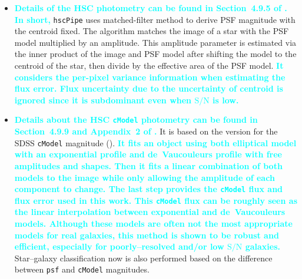 \documentclass[useamsfonts]{pasj01}
\def\hscpipe{\texttt{hscPipe}}
\def\cmodel{\texttt{cModel}}
\def\s2n{{$\mathrm{S}/\mathrm{N}$}}
\newcommand{\song}[1]{\textcolor{cyan} {\textbf{#1}}}
\begin{document}
\begin{enumerate}
\begin{itemize}
                \item \song{
                    Details of the HSC \psf{} photometry can be found in 
                    Section~4.9.5 of \citet{Bosch2017}. 
                    In short, 
                    }
                    \hscpipe{} uses matched-filter method to derive PSF magnitude 
                    with the centroid fixed. 
                    The algorithm matches the image of a star with the PSF model 
                    multiplied by an amplitude. 
                    This amplitude parameter is estimated via the inner product of 
                    the image and PSF model after shifting the model to the centroid 
                    of the star, then divide by the effective area of the PSF model.
                    \song{
                    It considers the per-pixel variance information when estimating 
                    the flux error. 
                    Flux uncertainty due to the uncertainty of centroid is ignored 
                    since it is subdominant even when \s2n{} is low. 
                    }
                    
                \item \song{
                    Details about the HSC \cmodel{} photometry can be found in 
                    Section~4.9.9 and Appendix~2 of \citet{Bosch2017}. 
                    }
                    It is based on the version for the SDSS \cmodel{} magnitude 
                    (\citealt{Lupton2001, Abazajian2004}). 
                    \song{
                    It fits an object using both elliptical model with an exponential 
                    profile and de~Vaucouleurs profile with free amplitudes and shapes. 
                    Then it fits a linear combination of both models to the image while 
                    only allowing the amplitude of each component to change.  
                    The last step provides the \cmodel{} flux and flux error used in 
                    this work. 
                    This \cmodel{} flux can be roughly seen as the linear interpolation 
                    between exponential and de~Vaucouleurs models. 
                    Although these models are often not the most appropriate models for 
                    real galaxies, this method is shown to be robust and efficient, 
                    especially for poorly--resolved and/or low \s2n{} galaxies. 
                    }
                    Star--galaxy classification now is also performed based on the 
                    difference between \texttt{psf} and \cmodel{}{} magnitudes.
                
            \end{itemize}

       
    \end{enumerate}
\end{document}
